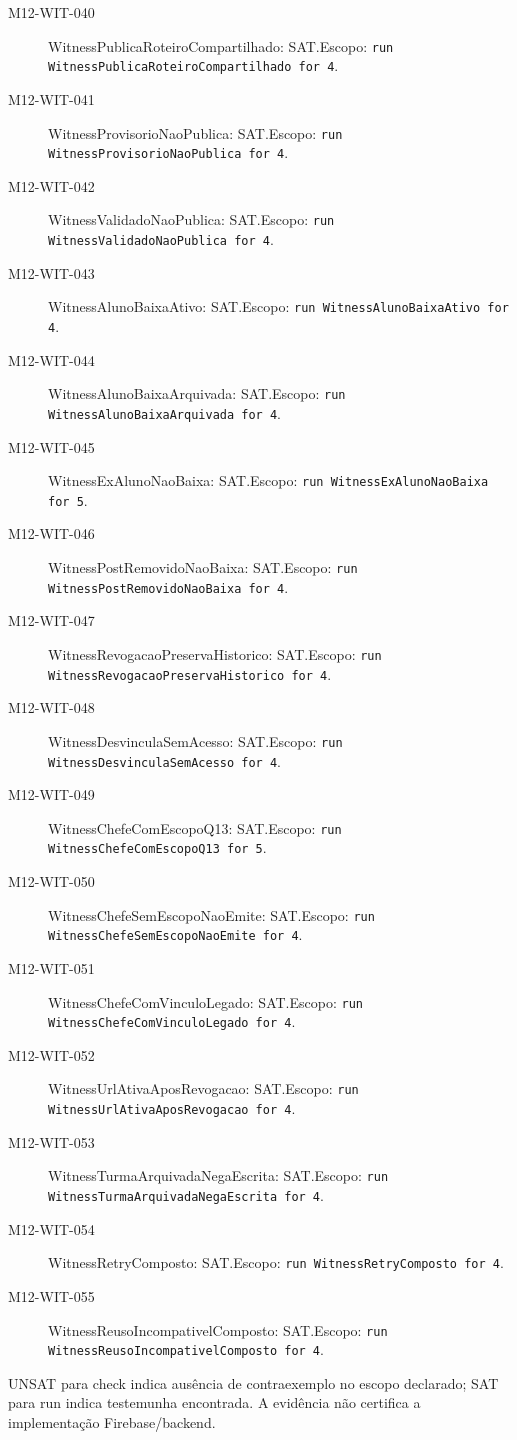 \begin{description}
\item[M12-WIT-040] WitnessPublicaRoteiroCompartilhado: SAT.\newline Escopo: \texttt{run WitnessPublicaRoteiroCompartilhado for 4}.
\item[M12-WIT-041] WitnessProvisorioNaoPublica: SAT.\newline Escopo: \texttt{run WitnessProvisorioNaoPublica for 4}.
\item[M12-WIT-042] WitnessValidadoNaoPublica: SAT.\newline Escopo: \texttt{run WitnessValidadoNaoPublica for 4}.
\item[M12-WIT-043] WitnessAlunoBaixaAtivo: SAT.\newline Escopo: \texttt{run WitnessAlunoBaixaAtivo for 4}.
\item[M12-WIT-044] WitnessAlunoBaixaArquivada: SAT.\newline Escopo: \texttt{run WitnessAlunoBaixaArquivada for 4}.
\item[M12-WIT-045] WitnessExAlunoNaoBaixa: SAT.\newline Escopo: \texttt{run WitnessExAlunoNaoBaixa for 5}.
\item[M12-WIT-046] WitnessPostRemovidoNaoBaixa: SAT.\newline Escopo: \texttt{run WitnessPostRemovidoNaoBaixa for 4}.
\item[M12-WIT-047] WitnessRevogacaoPreservaHistorico: SAT.\newline Escopo: \texttt{run WitnessRevogacaoPreservaHistorico for 4}.
\item[M12-WIT-048] WitnessDesvinculaSemAcesso: SAT.\newline Escopo: \texttt{run WitnessDesvinculaSemAcesso for 4}.
\item[M12-WIT-049] WitnessChefeComEscopoQ13: SAT.\newline Escopo: \texttt{run WitnessChefeComEscopoQ13 for 5}.
\item[M12-WIT-050] WitnessChefeSemEscopoNaoEmite: SAT.\newline Escopo: \texttt{run WitnessChefeSemEscopoNaoEmite for 4}.
\item[M12-WIT-051] WitnessChefeComVinculoLegado: SAT.\newline Escopo: \texttt{run WitnessChefeComVinculoLegado for 4}.
\item[M12-WIT-052] WitnessUrlAtivaAposRevogacao: SAT.\newline Escopo: \texttt{run WitnessUrlAtivaAposRevogacao for 4}.
\item[M12-WIT-053] WitnessTurmaArquivadaNegaEscrita: SAT.\newline Escopo: \texttt{run WitnessTurmaArquivadaNegaEscrita for 4}.
\item[M12-WIT-054] WitnessRetryComposto: SAT.\newline Escopo: \texttt{run WitnessRetryComposto for 4}.
\item[M12-WIT-055] WitnessReusoIncompativelComposto: SAT.\newline Escopo: \texttt{run WitnessReusoIncompativelComposto for 4}.
\end{description}
UNSAT para check indica ausência de contraexemplo no escopo declarado; SAT para run indica testemunha encontrada. A evidência não certifica a implementação Firebase/backend.
